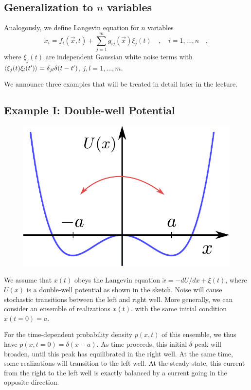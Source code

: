 \documentclass{notebook}
\begin{document}
\subsection*{Generalization to $n$ variables}
%
Analogously, we define Langevin equation for $n$ variables
\begin{equation}
\dot{x}_i = f_i(\vec x,t) + \sum_{j=1}^m g_{ij}(\vec x) \xi_j(t)\quad,\quad i = 1, \dots, n \quad,
\end{equation}
where $\xi_j(t)$ are independent Gaussian white noise terms with 
$\expval{\xi_j(t) \xi_l(t')} = \delta_{jl} \delta(t - t')$, $j, l = 1, \dots, m$.

We announce three examples that will be treated in detail later in the lecture. \\

\subsection*{Example I: Double-well Potential}

\begin{figure}[H]
	\centering
	\includegraphics[width=0.5\linewidth]{Pics/doublewell_potential}
	\label{fig:doublewellpotential}
\end{figure}
%
We assume that $x(t)$ obeys the Langevin equation
$\dot{x}=-dU/dx + \xi(t)$, 
where $U(x)$ is a double-well potential as shown in the sketch.
Noise will cause stochastic transitions between the left and right well.
More generally, we can consider an ensemble of realizations $x(t)$.
with the same initial condition $x(t = 0) = a$.

For the time-dependent probability density $p(x,t)$ of this ensemble, we thus have $p(x,t=0)=\delta(x-a)$. As time proceeds, this initial $\delta$-peak will broaden, until this peak has equilibrated in the right well.
At the same time, some realizations will transition to the left well. At the steady-state, this current from the right to the left well is exactly balanced by a current going in the opposite direction. 
\end{document}

